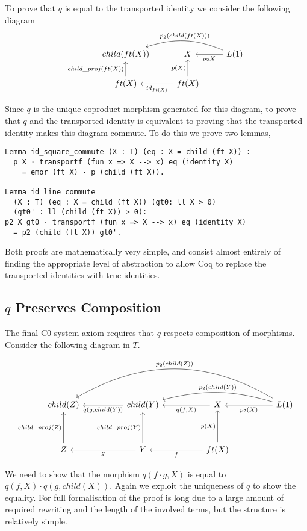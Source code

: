 To prove that $q$ is equal to the transported identity we consider the following
diagram
\[
\begin{tikzcd}
    child(ft(X)) &
    X & 
    L(1)
    \ar[l, "p_2 X"]
    \ar[ll, bend right=20, "p_2 (child(ft(X)))"'] \\
    ft(X)
    \ar[u, "child\_proj(ft(X))"] &
    ft(X)
    \ar[u, "p(X)"]
    \ar[l, "id_{ft(X)}"] &
\end{tikzcd}    
\]

Since $q$ is the unique coproduct morphism generated for this diagram, to prove
that $q$ and the transported identity is equivalent to proving that the
transported identity makes this diagram commute. To do this we prove two lemmas,
\begin{lstlisting}
Lemma id_square_commute (X : T) (eq : X = child (ft X)) : 
  p X · transportf (fun x => X --> x) eq (identity X)
    = emor (ft X) · p (child (ft X)).

Lemma id_line_commute 
  (X : T) (eq : X = child (ft X)) (gt0: ll X > 0) 
  (gt0' : ll (child (ft X)) > 0):
p2 X gt0 · transportf (fun x => X --> x) eq (identity X)
  = p2 (child (ft X)) gt0'.
\end{lstlisting}
Both proofs are mathematically very simple, and consist almost entirely of
finding the appropriate level of abstraction to allow Coq to replace the
transported identities with true identities.

\subsection{$q$ Preserves Composition}
The final C0-system axiom requires that $q$ respects composition of morphisms.
Consider the following diagram in $T$.

\[
\begin{tikzcd}[sep=huge]
    child(Z)&
    child(Y)
    \ar[l, "{q(g, child(Y))}"]&
    X
    \ar[l, "{q(f, X)}"]&
    L(1)
    \ar[l, "p_2(X)"]
    \ar[ll, bend right=15, "p_2(child(Y))"']
    \ar[lll, bend right=30, "p_2(child(Z))"']\\
    Z
    \ar[u,"child\_proj(Z)"]&
    Y
    \ar[l, "g"]
    \ar[u, "child\_proj(Y)"]&
    ft(X)
    \ar[l, "f"]
    \ar[u, "p(X)"]
\end{tikzcd}    
\]

We need to show that the morphism $q(f\cdot g, X)$ is equal to $q(f, X)\cdot
q(g, child(X))$. Again we exploit the uniqueness of $q$ to show the equality.
For full formalisation of the proof is long due to a large amount of required
rewriting and the length of the involved terms, but the structure is relatively
simple.

